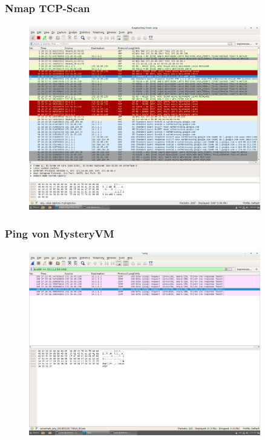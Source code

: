 \documentclass[12pt]{article}
\theoremstyle{plain}
\begin{document}
\subsubsection*{Nmap TCP-Scan}
\begin{figure}[!ht]
	\centering
     \includegraphics[width=0.9\textwidth]{Bilder/nmap_tcp_scan.png}
\end{figure}
\newpage

\subsubsection*{Ping von MysteryVM}
\begin{figure}[!ht]
	\centering
     \includegraphics[width=0.9\textwidth]{Bilder/ping_von_mysteryVM.png}
\end{figure}
\newpage
\end{document}
